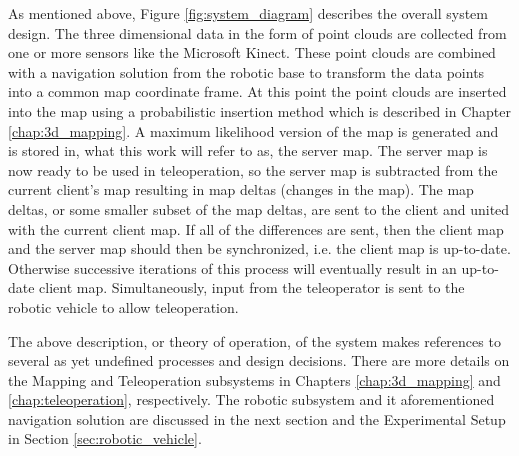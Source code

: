 \documentclass[12pt]{report}
\begin{document}
As mentioned above, Figure \ref{fig:system_diagram} describes the overall system design.  The three dimensional data in the form of point clouds are collected from one or more sensors like the Microsoft Kinect.  These point clouds are combined with a navigation solution from the robotic base to transform the data points into a common map coordinate frame.  At this point the point clouds are inserted into the map using a probabilistic insertion method which is described in Chapter \ref{chap:3d_mapping}.  A maximum likelihood version of the map is generated and is stored in, what this work will refer to as, the server map.  The server map is now ready to be used in teleoperation, so the server map is subtracted from the current client's map resulting in map deltas (changes in the map).  The map deltas, or some smaller subset of the map deltas, are sent to the client and united with the current client map.  If all of the differences are sent, then the client map and the server map should then be synchronized, i.e. the client map is up-to-date.  Otherwise successive iterations of this process will eventually result in an up-to-date client map.  Simultaneously, input from the teleoperator is sent to the robotic vehicle to allow teleoperation.

The above description, or theory of operation, of the system makes references to several as yet undefined processes and design decisions.  There are more details on the Mapping and Teleoperation subsystems in Chapters \ref{chap:3d_mapping} and \ref{chap:teleoperation}, respectively.  The robotic subsystem and it aforementioned navigation solution are discussed in the next section and the Experimental Setup in Section \ref{sec:robotic_vehicle}.

\end{document}
